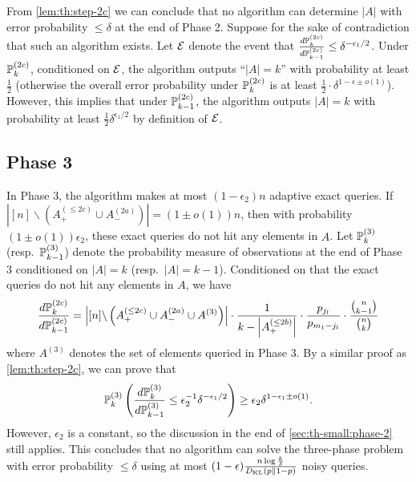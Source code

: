 From \cref{lem:th:step-2c} we can conclude that no algorithm can determine $|A|$ with error probability $\le \delta$ at the end of Phase 2.
Suppose for the sake of contradiction that such an algorithm exists.
Let $\mathcal{E}$ denote the event that $\frac{d \mathbb{P}^{(2c)}_k}{d \mathbb{P}^{(2c)}_{k-1}} \le \delta^{-\epsilon_1/2}$.
Under $\mathbb{P}^{(2c)}_k$, conditioned on $\mathcal{E}$, the algorithm outputs ``$|A|=k$'' with probability at least $\frac 12$ (otherwise the overall error probability under $\mathbb{P}^{(2c)}_k$ is at least $\frac 12 \cdot \delta^{1-\epsilon\pm o(1)}$).
However, this implies that under $\mathbb{P}^{(2c)}_{k-1}$, the algorithm outputs $|A|=k$ with probability at least $\frac 12 \delta^{\epsilon_1/2}$ by definition of $\mathcal{E}$.

\subsection{Phase 3} \label{sec:th-small:phase-3}
In Phase 3, the algorithm makes at most $(1-\epsilon_2) n$ adaptive exact queries.
If $\left| [n]\backslash \left(A_+^{(\le 2c)} \cup A_-^{(2a)}\right) \right| = (1\pm o(1)) n$, then with probability $(1\pm o(1))\epsilon_2$, these exact queries do not hit any elements in $A$.
Let $\mathbb{P}^{(3)}_k$ (resp.~$\mathbb{P}^{(3)}_{k-1}$) denote the probability measure of observations at the end of Phase 3 conditioned on $|A|=k$ (resp.~$|A|=k-1$).
Conditioned on that the exact queries do not hit any elements in $A$, we have
\begin{align*}
  \frac{d \mathbb{P}^{(2c)}_k}{d \mathbb{P}^{(2c)}_{k-1}} =\left| [n]\backslash \left(A_+^{(\le 2c)} \cup A_-^{(2a)} \cup A^{(3)}\right) \right|\cdot \frac{1}{k-\left| A_+^{(\le 2b)} \right|} \cdot \frac{p_{j_l}}{p_{m_1-j_l}} \cdot \frac{\binom n{k-1}}{\binom nk}
\end{align*}
where $A^{(3)}$ denotes the set of elements queried in Phase 3.
By a similar proof as \cref{lem:th:step-2c}, we can prove that
\begin{align*}
  \mathbb{P}^{(3)}_k \left(\frac{d \mathbb{P}^{(3)}_k}{d \mathbb{P}^{(3)}_{k-1}} \le \epsilon_2^{-1}\delta^{-\epsilon_1/2}\right) \ge \epsilon_2 \delta^{1-\epsilon_1 \pm o(1)}.
\end{align*}
However, $\epsilon_2$ is a constant, so the discussion in the end of \cref{sec:th-small:phase-2} still applies.
This concludes that no algorithm can solve the three-phase problem with error probability $\le \delta$ using at most $(1-\epsilon) \frac{n \log \frac k\delta}{D_{\operatorname{\mathrm{KL}}}(p \parallel 1-p)}$ noisy queries.
